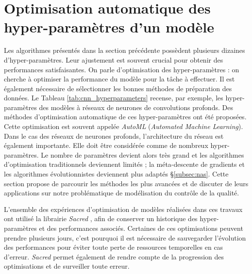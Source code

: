 
\section{Optimisation automatique des hyper-paramètres d'un modèle} \label{section:auto_ml}
Les algorithmes présentés dans la section précédente possèdent plusieurs dizaines d'hyper-paramètres.
Leur ajustement est souvent crucial pour obtenir des performances satisfaisantes.
On parle d'optimisation des hyper-paramètres : on cherche à optimiser la performance du modèle pour la tâche à effectuer.
Il est également nécessaire de sélectionner les bonnes méthodes de préparation des données.
Le Tableau \ref{tab:cnn_hyperparameters} recense, par exemple, les hyper-paramètres des modèles à réseaux de neurones de convolutions profonds.
Des méthodes d'optimisation automatique de ces hyper-paramètres ont été proposées.
Cette optimisation est souvent appelée \textit{AutoML} (\textit{Automated Machine Learning}).
Dans le cas des réseaux de neurones profonds, l'architecture du réseau est également importante.
Elle doit être considérée comme de nombreux hyper-paramètres.
Le nombre de paramètres devient alors très grand et les algorithmes d'optimisation traditionnels deviennent limités ; la méta-descente de gradients et les algorithmes évolutionnistes deviennent plus adaptés §\ref{subsec:nas}.
Cette section propose de parcourir les méthodes les plus avancées et de discuter de leurs applications sur notre problématique de modélisation du contrôle de la qualité.

L'ensemble des expériences d'optimisation de modèles réalisées dans ces travaux ont utilisé la librairie \textit{Sacred} \cite{greff_sacred_2017}, afin de conserver un historique des hyper-paramètres et des performances associés.
Certaines de ces optimisations peuvent prendre plusieurs jours, c'est pourquoi il est nécessaire de sauvegarder l'évolution des performances pour éviter toute perte de ressources temporelles en cas d'erreur.
\textit{Sacred} permet également de rendre compte de la progression des optimisations et de surveiller toute erreur.

